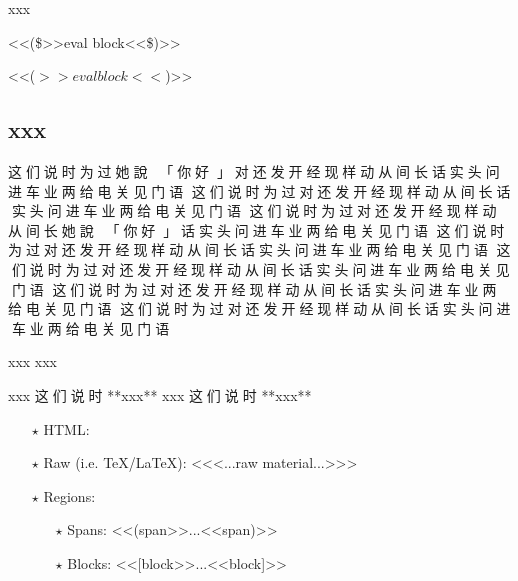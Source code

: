
\begin{multicols}{2}
xxx\mktsShowpar\par
{\mktsStyleCode{}<<(\$>>eval block<<\$)>>}\mktsShowpar\par
{\mktsStyleCode{}<<($>>eval block<<$)>>}\mktsShowpar\par

\subsection{xxx
}
{\cn{}这们说时为过她說：}{\cn{}「}{\cn{}你好}{\cn{}」}{\cn{}对还发开经现样动从间长话实头问进车业两给电关见门语
这们说时为过对还发开经现样动从间长话实头问进车业两给电关见门语
这们说时为过对还发开经现样动从间长她說：}{\cn{}「}{\cn{}你好}{\cn{}」}{\cn{}话实头问进车业两给电关见门语
这们说时为过对还发开经现样动从间长话实头问进车业两给电关见门语
这们说时为过对还发开经现样动从间长话实头问进车业两给电关见门语
这们说时为过对还发开经现样动从间长话实头问进车业两给电关见门语
这们说时为过对还发开经现样动从间长话实头问进车业两给电关见门语}\mktsShowpar\par
xxx {} xxx\mktsShowpar\par
\begingroup\mktsObeyAllLines\mktsStyleCode{}xxx {\cn{}这们说时 }**xxx**
\endgroup{}\begingroup\mktsObeyAllLines\mktsStyleCode{}xxx {\cn{}这们说时 }**xxx**
\endgroup{}\begin{itemize}\item[$\star$] HTML:\mktsShowpar\par

\item[$\star$] Raw (i.e. \TeX/\LaTeX): {\mktsStyleCode{}<<<...raw material...>>>}
\mktsShowpar\par

\item[$\star$] Regions:
\mktsShowpar\par
\begin{itemize}\item[$\star$] Spans: {\mktsStyleCode{}<<(span>>...<<span)>>}\mktsShowpar\par

\item[$\star$] Blocks: {\mktsStyleCode{}<<[block>>...<<block]>>}\mktsShowpar\par


\end{itemize}
\end{itemize}
\end{multicols}
